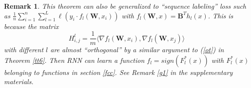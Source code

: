 \documentclass{article}
\newcommand{\cO}{\mathcal{O}}
\newtheorem{rem}{\textbf{Remark}}[section]
\newcommand{\dataset}{{\cal D}}
\begin{document}
\begin{rem}
This theorem can also be generalized to ``sequence labeling'' loss such as $\frac{1}{n}\sum_{i=1}^n\sum_{l=1}^L\ell(y_i\cdot f_l(\bm{W},x_i))$ with $f_l(\bm{W},x)=\bm{B}^Th_l(x)$. This is because the matrix $$H^l_{i,j}=\frac{1}{m}\langle \nabla f_l(\bm{W},x_i), \nabla f_l(\bm{W},x_j)\rangle$$ with different $l$ are almost ``orthogonal'' by a similar argument to (\ref{ot}) in Theorem \ref{tt6}. Then RNN can learn a function $f_l=sign(F^*_l(x))$ with $F^*_l(x)$ belonging to functions in section \ref{fcc}. See Remark \ref{g1} in the supplementary materials.
\end{rem}

\end{document}
